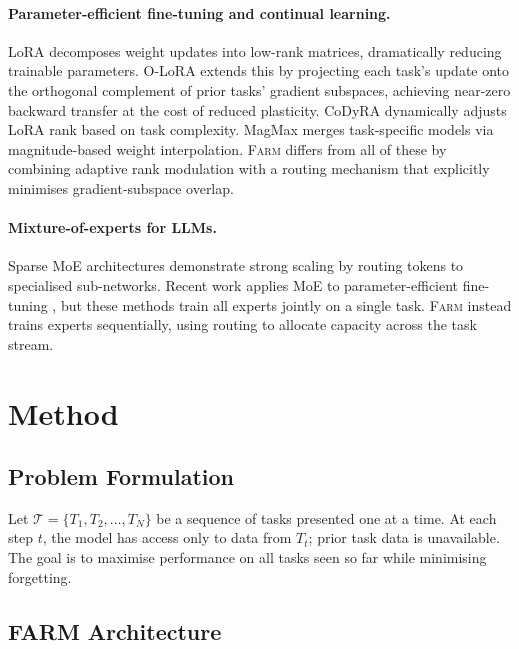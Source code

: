\documentclass{article}
\newcommand{\FARM}{\textsc{Farm}}
\begin{document}
\paragraph{Parameter-efficient fine-tuning and continual learning.}
LoRA \citep{hu2022lora} decomposes weight updates into low-rank matrices, dramatically reducing trainable parameters. O-LoRA \citep{wang2023orthogonal} extends this by projecting each task's update onto the orthogonal complement of prior tasks' gradient subspaces, achieving near-zero backward transfer at the cost of reduced plasticity. CoDyRA \citep{zhang2024codyre} dynamically adjusts LoRA rank based on task complexity. MagMax \citep{marczak2024magmax} merges task-specific models via magnitude-based weight interpolation. \FARM{} differs from all of these by combining adaptive rank modulation with a routing mechanism that explicitly minimises gradient-subspace overlap.

\paragraph{Mixture-of-experts for LLMs.}
Sparse MoE architectures \citep{shazeer2017outrageously, fedus2022switch} demonstrate strong scaling by routing tokens to specialised sub-networks. Recent work applies MoE to parameter-efficient fine-tuning \citep{zadouri2023pushing, wu2024mixture}, but these methods train all experts jointly on a single task. \FARM{} instead trains experts sequentially, using routing to allocate capacity across the task stream.

\section{Method}
\label{sec:method}

\subsection{Problem Formulation}
Let $\mathcal{T} = \{T_1, T_2, \ldots, T_N\}$ be a sequence of tasks presented one at a time. At each step $t$, the model has access only to data from $T_t$; prior task data is unavailable. The goal is to maximise performance on all tasks seen so far while minimising forgetting.

\subsection{FARM Architecture}
\label{sec:arch}
\end{document}

